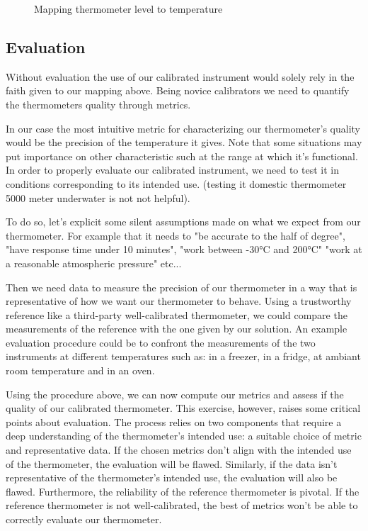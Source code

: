 \begin{bibunit}
\begin{figure}[h]
    \caption{Mapping thermometer level to temperature}
    \label{fig:therm_mapping}
\end{figure}

\subsection{Evaluation}

Without evaluation the use of our calibrated instrument would solely rely in the faith given to our mapping above.
Being novice calibrators we need to quantify the thermometers quality through metrics.

In our case the most intuitive metric for characterizing our thermometer's quality would be the precision of the temperature it gives.
Note that some situations may put importance on other characteristic such at the range at which it's functional.
  In order to properly evaluate our calibrated instrument, we need to test it in conditions corresponding to its intended use. (testing it domestic thermometer 5000 meter underwater is not not helpful).

 To do so, let's explicit some silent assumptions made on what we expect from our thermometer.
  For example that it needs to "be accurate to the half of degree", "have response time under 10 minutes", "work between -30°C and 200°C" "work at a reasonable atmospheric pressure" etc...

Then we need data to measure the precision of our thermometer in a way that is representative of how we want our thermometer to behave. Using a trustworthy reference like a third-party well-calibrated thermometer, we could compare the measurements of the reference with the one given by our solution.
  An example evaluation procedure could be to confront the measurements of the two instruments at different temperatures such as: in a freezer, in a fridge, at ambiant room temperature and in an oven.

Using the procedure above, we can now compute our metrics and assess if the quality of our calibrated thermometer.
This exercise, however, raises some critical points about evaluation. The process relies on two components that require a deep understanding of the thermometer's intended use: a suitable choice of metric and representative data. If the chosen metrics don't align with the intended use of the thermometer, the evaluation will be flawed. Similarly, if the data isn't representative of the thermometer's intended use, the evaluation will also be flawed.
 Furthermore, the reliability of the reference thermometer is pivotal. If the reference thermometer is not well-calibrated, the best of metrics won't be able to correctly evaluate our thermometer. 


\end{bibunit}
